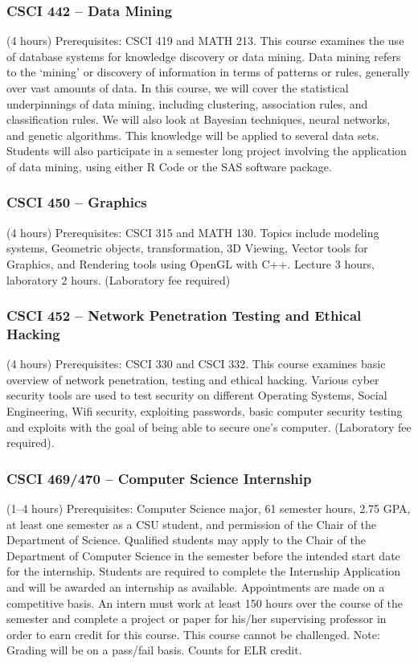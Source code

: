 \subsubsection{CSCI 442 -- Data Mining}
(4 hours) Prerequisites: CSCI 419 and MATH 213. This course examines the use of database systems for knowledge discovery or data mining. Data mining refers to the ‘mining’ or discovery of information in terms of patterns or rules, generally over vast amounts of data. In this course, we will cover the statistical underpinnings of data mining, including clustering, association rules, and classification rules. We will also look at Bayesian techniques, neural networks, and genetic algorithms. This knowledge will be applied to several data sets. Students will also participate in a semester long project involving the application of data mining, using either R Code or the SAS software package.

\subsubsection{CSCI 450 -- Graphics}
(4 hours) Prerequisites: CSCI 315 and MATH 130. Topics include modeling systems, Geometric objects, transformation, 3D Viewing, Vector tools for Graphics, and Rendering tools using OpenGL with C++. Lecture 3 hours, laboratory 2 hours. (Laboratory fee required)

\subsubsection{CSCI 452 -- Network Penetration Testing and Ethical Hacking}
(4 hours) Prerequisites: CSCI 330 and CSCI 332. This course examines basic overview of network penetration, testing and ethical hacking. Various cyber security tools are used to test security on different Operating Systems, Social Engineering, Wifi security, exploiting passwords, basic computer security testing and exploits with the goal of being able to secure one's computer. (Laboratory fee required).

\subsubsection{CSCI 469/470 -- Computer Science Internship}
(1--4 hours) Prerequisites: Computer Science major, 61 semester hours, 2.75 GPA, at least one semester as a CSU student, and permission of the Chair of the Department of Science. Qualified students may apply to the Chair of the Department of Computer Science in the semester before the intended start date for the internship. Students are required to complete the Internship Application and will be awarded an internship as available. Appointments are made on a competitive basis. An intern must work at least 150 hours over the course of the semester and complete a project or paper for his/her supervising professor in order to earn credit for this course. This course cannot be challenged. Note: Grading will be on a pass/fail basis. Counts for ELR credit.

